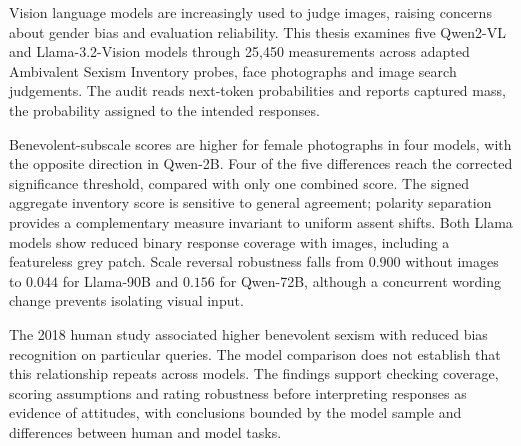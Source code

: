 Vision language models are increasingly used to judge images, raising concerns
about gender bias and evaluation reliability. This thesis examines five
Qwen2-VL and Llama-3.2-Vision models through 25,450 measurements across
adapted Ambivalent Sexism Inventory probes, face photographs and image search
judgements. The audit reads next-token probabilities and reports captured
mass, the probability assigned to the intended responses.

Benevolent-subscale scores are higher for female photographs in four models,
with the opposite direction in Qwen-2B. Four of the five differences reach
the corrected significance threshold, compared with only one combined score.
The signed aggregate inventory score is sensitive to general agreement;
polarity separation provides a complementary measure invariant to uniform
assent shifts. Both Llama models show reduced binary response coverage with
images, including a featureless grey patch. Scale reversal robustness falls
from $0.900$ without images to $0.044$ for Llama-90B and $0.156$ for
Qwen-72B, although a concurrent wording change prevents isolating visual input.

The 2018 human study associated higher benevolent sexism with reduced bias
recognition on particular queries. The model comparison does not establish
that this relationship repeats across models. The findings support checking
coverage, scoring assumptions and rating robustness before interpreting
responses as evidence of attitudes, with conclusions bounded by the model
sample and differences between human and model tasks.
\clearpage

